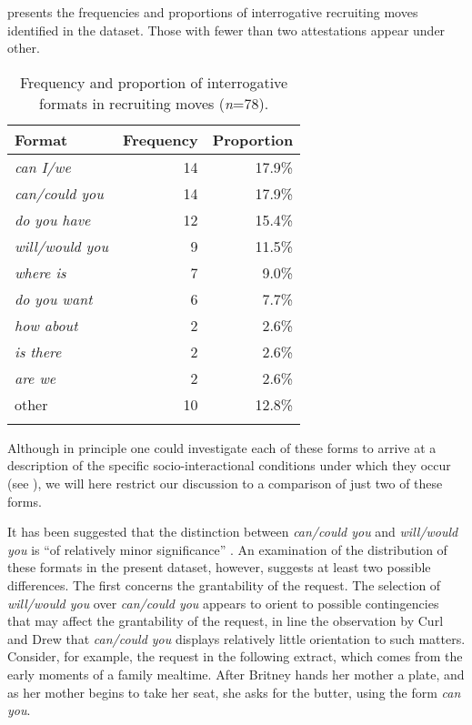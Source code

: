 \documentclass[output=paper,nonflat,modfont,draft]{langsci/langscibook}
\begin{document}
 presents the frequencies and proportions of interrogative recruiting moves identified in the dataset. Those with fewer than two attestations appear under other.

\begin{table}
\begin{tabularx}{0.66\textwidth}{Xrr}
\lsptoprule
Format	& Frequency	& Proportion  \\
\midrule
\textit{can I/we} 	& 14	& 17.9\%          \\
\textit{can/could you} 	& 14	& 17.9\%     \\
\textit{do you have} 	& 12	& 15.4\%       \\
\textit{will/would you} 	& 9	& 11.5\%     \\
\textit{where is} 	& 7	& 9.0\%            \\
\textit{do you want} 	& 6	& 7.7\%         \\
\textit{how about} 	& 2	& 2.6\%           \\
\textit{is there} 	& 2	& 2.6\%            \\
\textit{are we} 	& 2	& 2.6\%              \\
other	& 10	& 12.8\%              \\
\lspbottomrule
\end{tabularx}
\caption{\label{tab:kendrick:3} Frequency and proportion of interrogative formats in recruiting moves (\textit{n}=78).}
\end{table}

Although in principle one could investigate each of these forms to arrive at a description of the specific socio-interactional conditions under which they occur (see \citealt{Rossi2015a,Zinken2015,fox_rethinking_2016,FoxHeinemann2017}), we will here restrict our discussion to  a comparison of just two of these forms.

It has been suggested that the distinction between \textit{can/could you} and \textit{will/would you}  is “of relatively minor significance” \citep[150, fn. 1]{curlcontingency2008}. An examination of the distribution of these formats in the present dataset, however, suggests at least two possible differences. The first concerns the grantability of the request. The selection of \textit{will/would you} over \textit{can/could you} appears to orient to possible contingencies that may affect the grantability of the request, in line the observation by Curl and Drew that \textit{can/could you} displays relatively little orientation to such matters. Consider, for example, the request in the following extract, which comes from the early moments of a family mealtime. After Britney hands her mother a plate, and as her mother begins to take her seat, she asks for the butter, using the form \textit{can you}.
\end{document}
